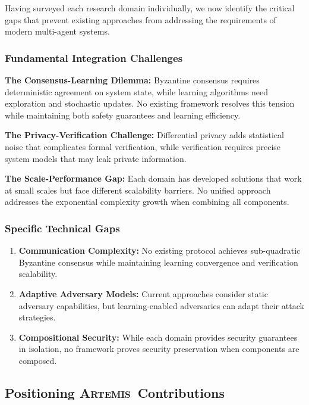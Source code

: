 \documentclass[conference]{IEEEtran}
\newcommand{\artemis}{\textsc{Artemis}}
\begin{document}
Having surveyed each research domain individually, we now identify the critical gaps that prevent existing approaches from addressing the requirements of modern multi-agent systems.

\subsubsection{Fundamental Integration Challenges}

\textbf{The Consensus-Learning Dilemma:} Byzantine consensus requires deterministic agreement on system state, while learning algorithms need exploration and stochastic updates. No existing framework resolves this tension while maintaining both safety guarantees and learning efficiency.

\textbf{The Privacy-Verification Challenge:} Differential privacy adds statistical noise that complicates formal verification, while verification requires precise system models that may leak private information.

\textbf{The Scale-Performance Gap:} Each domain has developed solutions that work at small scales but face different scalability barriers. No unified approach addresses the exponential complexity growth when combining all components.

\subsubsection{Specific Technical Gaps}

\begin{enumerate}
    \item \textbf{Communication Complexity:} No existing protocol achieves sub-quadratic Byzantine consensus while maintaining learning convergence and verification scalability.
    
    \item \textbf{Adaptive Adversary Models:} Current approaches consider static adversary capabilities, but learning-enabled adversaries can adapt their attack strategies.
    
    \item \textbf{Compositional Security:} While each domain provides security guarantees in isolation, no framework proves security preservation when components are composed.
\end{enumerate}

\subsection{Positioning \artemis\ Contributions}
\end{document}
